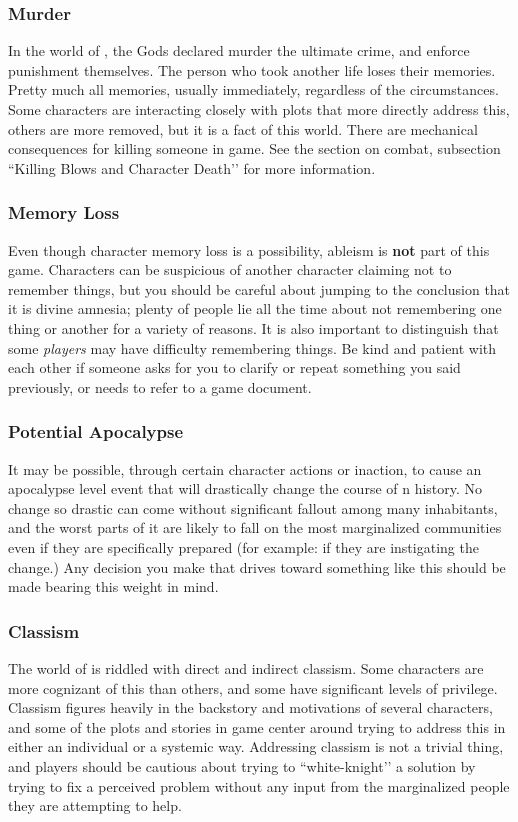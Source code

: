 \documentclass[sheet]{GL2020}
\begin{document}
\subsubsection{Murder}
In the world of \pEarth{}, the Gods declared murder the ultimate crime, and enforce punishment themselves. The person who took another life loses their memories. Pretty much all memories, usually immediately, regardless of the circumstances. Some characters are interacting closely with plots that more directly address this, others are more removed, but it is a fact of this world. There are mechanical consequences for killing someone in game. See the section on combat, subsection ``Killing Blows and Character Death’’ for more information.

\subsubsection{Memory Loss}
Even though character memory loss is a possibility, ableism is \textbf{not} part of this game. Characters can be suspicious of another character claiming not to remember things, but you should be careful about jumping to the conclusion that it is divine amnesia; plenty of people lie all the time about not remembering one thing or another for a variety of reasons. It is also important to distinguish that some \emph{players} may have difficulty remembering things. Be kind and patient with each other if someone asks for you to clarify or repeat something you said previously, or needs to refer to a game document.

\subsubsection{Potential Apocalypse}
It may be possible, through certain character actions or inaction, to cause an apocalypse level event that will drastically change the course of \pEarth{}n history. No change so drastic can come without significant fallout among many inhabitants, and the worst parts of it are likely to fall on the most marginalized communities even if they are specifically prepared (for example: if they are instigating the change.) Any decision you make that drives toward something like this should be made bearing this weight in mind.

\subsubsection{Classism}
The world of \pEarth{} is riddled with direct and indirect classism. Some characters are more cognizant of this than others, and some have significant levels of privilege. Classism figures heavily in the backstory and motivations of several characters, and some of the plots and stories in game center around trying to address this in either an individual or a systemic way. Addressing classism is not a trivial thing, and players should be cautious about trying to ``white-knight’’ a solution by trying to fix a perceived problem without any input from the marginalized people they are attempting to help.
\end{document}

